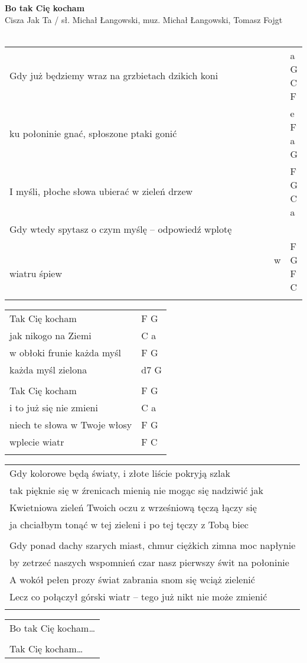 \documentclass[a5paper]{article}
\begin{document}


\noindent
\fontsize{12pt}{15pt}\selectfont
\textbf{Bo tak Cię kocham} \\
\fontsize{8pt}{10pt}\selectfont
Cisza Jak Ta / sł. Michał Łangowski, muz. Michał Łangowski, Tomasz Fojgt \\ \\
\fontsize{10pt}{12pt}\selectfont
{}
\begin{tabular}{@{}p{9cm}p{2cm}@{}}
\noindent
Gdy już będziemy wraz na grzbietach dzikich koni & a G C F \\
ku połoninie gnać, spłoszone ptaki gonić & e F a G \\
I myśli, płoche słowa ubierać w zieleń drzew & F G C a \\
Gdy wtedy spytasz o czym myślę – odpowiedź wplotę & \\
~~~~~~~~~~~~~~~~~~~~~~~~~~~~~~~~~~~~~~~~~~~~~~~~~~~~~~~~w wiatru śpiew & F G F C \\ \\
\end{tabular}

\noindent
\begin{tabular}{@{}p{8cm}p{2cm}@{}}
Tak Cię kocham & F G \\
jak nikogo na Ziemi & C a \\
w obłoki frunie każda myśl & F G \\
każda myśl zielona & d7 G \\ \\

Tak Cię kocham & F G \\
i to już się nie zmieni & C a \\
niech te słowa w Twoje włosy & F G \\
wplecie wiatr & F C \\ \\
\end{tabular}

\noindent
\begin{tabular}{@{}p{10.5cm}@{}}
Gdy kolorowe będą światy, i złote liście pokryją szlak \\
tak pięknie się w źrenicach mienią nie mogąc się nadziwić jak \\
Kwietniowa zieleń Twoich oczu z wrześniową tęczą łączy się \\
ja chciałbym tonąć w tej zieleni i po tej tęczy z Tobą biec \\ \\

Gdy ponad dachy szarych miast, chmur ciężkich zimna moc napłynie \\
by zetrzeć naszych wspomnień czar nasz pierwszy świt na połoninie \\
A wokół pełen prozy świat zabrania snom się wciąż zielenić \\
Lecz co połączył górski wiatr – tego już nikt nie może zmienić \\ \\
\end{tabular}

\noindent
\begin{tabular}{@{}p{8.5cm}@{}}
Bo tak Cię kocham… \\ \\
Tak Cię kocham…
\end{tabular}
\end{document}
